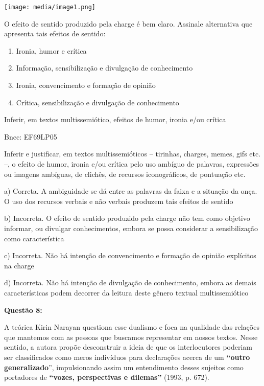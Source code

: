 \texttt{[image: media/image1.png]}

O efeito de sentido produzido pela charge é bem claro. Assinale
alternativa que apresenta tais efeitos de sentido:

\begin{enumerate}
\def\labelenumi{\alph{enumi})}
\item
  Ironia, humor e crítica
\item
  Informação, sensibilização e divulgação de conhecimento
\item
  Ironia, convencimento e formação de opinião
\item
  Crítica, sensibilização e divulgação de conhecimento
\end{enumerate}

Inferir, em textos multissemiótico, efeitos de humor, ironia e/ou
crítica

Bncc: EF69LP05

Inferir e justificar, em textos multissemióticos -- tirinhas, charges,
memes, gifs etc. --, o efeito de humor, ironia e/ou crítica pelo uso
ambíguo de palavras, expressões ou imagens ambíguas, de clichês, de
recursos iconográficos, de pontuação etc.

a) Correta. A ambiguidade se dá entre as palavras da faixa e a situação
da onça. O uso dos recursos verbais e não verbais produzem tais efeitos
de sentido

b) Incorreta. O efeito de sentido produzido pela charge não tem como
objetivo informar, ou divulgar conhecimentos, embora se possa considerar
a sensibilização como característica

c) Incorreta. Não há intenção de convencimento e formação de opinião
explícitos na charge

d) Incorreta. Não há intenção de divulgação de conhecimento, embora as
demais características podem decorrer da leitura deste gênero textual
multissemiótico

\textbf{Questão 8:}

A teórica Kirin Narayan questiona esse dualismo e foca na qualidade das
relações que mantemos com as pessoas que buscamos representar em nossos
textos. Nesse sentido, a autora propõe desconstruir a ideia de que os
interlocutores poderiam ser classificados como meros indivíduos para
declarações acerca de um \textbf{``outro generalizado}'', impulsionando
assim um entendimento desses sujeitos como portadores de
\textbf{``vozes, perspectivas e dilemas''} (1993, p. 672).

